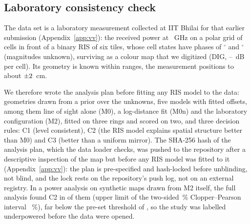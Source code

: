 \begin{figure}[t]
\centering
{}
\end{figure}

\subsection{Laboratory consistency check}\label{sec:vv-lab}
The data set is a laboratory measurement collected at IIT Bhilai for that earlier submission
(Appendix~\ref{app:vv}): the received power at \numLabFreqGHz~GHz on a polar grid of
\numLabCells{} cells in front of a binary RIS of six tiles, whose cell states have phases of
\numLabStateOnePhaseDeg$^\circ$ and \numLabStateTwoPhaseDeg$^\circ$ (magnitudes unknown), surviving
as a colour map that we digitized (DIG, \numLabSigDigMinDb--\numLabSigDigMaxDb~dB per cell). Its geometry is known within ranges, the measurement positions to about
$\pm2$~cm.

We therefore wrote the analysis plan before fitting any RIS model to the
data: \numLabDraws{} geometries drawn from a prior over the unknowns, five models with fitted
offsets, among them line of sight alone (M0), a log-distance fit (M0n) and the laboratory
configuration (M2), fitted on three rings and scored on two, and three decision rules: C1
(level consistent), C2 (the RIS model explains spatial structure better than M0) and C3
(better than a uniform mirror). The SHA-256 hash of the analysis plan, which the data loader checks, was pushed to the
repository after
a descriptive inspection of the map but before any RIS model was fitted to it
(Appendix~\ref{app:vv}): the plan
is pre-specified and hash-locked before unblinding, not blind, and the lock rests on the
repository's push log, not on an external registry.
In a power analysis on \numLabDecoys{} synthetic maps drawn from M2 itself,
the full analysis found C2 in \numLabDecoyDetections{} of them (upper limit of the two-sided \numCiPct\,\%
Clopper--Pearson interval \numLabDecoyCiHighPct~\%), far
below the pre-set threshold of \numLabUnderpoweredRate{}, so the study was labelled
underpowered before the data were opened.


